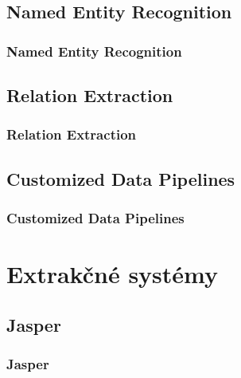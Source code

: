 \documentclass{beamer}
\newcommand{\footcite}[1]{\footnote{\tiny #1}}
\begin{document}
\subsection{Named Entity Recognition}
\begin{frame}[fragile=singleslide]\frametitle{\textbf{Named Entity Recognition}}

\end{frame}

\subsection{Relation Extraction}
\begin{frame}[fragile=singleslide]\frametitle{\textbf{Relation Extraction}}
%
%
\end{frame}

\subsection{Customized Data Pipelines}
\begin{frame}[fragile=singleslide]\frametitle{\textbf{Customized Data Pipelines}}
\end{frame}

\section{Extrakčné systémy}

\subsection{Jasper}
\begin{frame}[fragile=singleslide]\frametitle{\textbf{Jasper}}
\end{frame}
\end{document}
